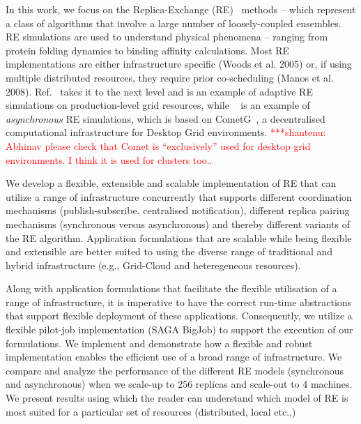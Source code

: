 \documentclass{rspublic}
\newcommand{\jhanote}[1]{ {\textcolor{red} { ***shantenu: #1 }}}
\newcommand{\jhanote}[1]{}
\begin{document}
In this work, we focus on the Replica-Exchange
(RE)~\citep{hansmann,Sugita:1999rm} methods -- which represent a class
of algorithms that involve a large number of loosely-coupled
ensembles.  RE simulations are used to understand physical phenomena
-- ranging from protein folding dynamics to binding affinity
calculations. Most RE implementations are either infrastructure
specific (Woods et al. 2005) or, if using multiple distributed
resources, they require prior co-scheduling (Manos et
al. 2008). Ref.~\citep{Luckow:2008fp} takes it to the next level and
is an example of adaptive RE simulations on production-level grid
resources, while ~\citep{parashar_arepex} is an example of
\emph{asynchronous} RE simulations, which is based on
CometG~\citep{Li:2005:CSC:1090948.1091381}, a decentralised
computational infrastructure for Desktop Grid environments.
\jhanote{Abhinav please check that Comet is ``exclusively'' used for
  desktop grid environments. I think it is used for clusters too..}

We develop a flexible, extensible and scalable implementation of RE
that can utilize a range of infrastructure concurrently that supports
different coordination mechanisms (publish-subscribe, centralised
notification), different replica pairing mechanisms (synchronous
versus asynchronous) and thereby different variants of the RE
algorithm.  Application formulations that are scalable while being
flexible and extensible are better suited to using the diverse range
of traditional and hybrid infrastructure (e.g., Grid-Cloud and
heteregeneous resources).  

Along with application formulations that facilitate the flexible
utilisation of a range of infrastructure, it is imperative to have the
correct run-time abstractions that support flexible deployment of
these applications.  Consequently, we utilize a flexible pilot-job
implementation (SAGA BigJob) to support the execution of our
formulations.  We implement and demonstrate how a flexible and robust
implementation enables the efficient use of a broad range of
infrastructure. We compare and analyze the performance of the
different RE models (synchronous and asynchronous) when we scale-up to
256 replicas and scale-out to 4 machines. We present results using
which the reader can understand which model of RE is most suited for a
particular set of resources (distributed, local etc.,)
\end{document}
